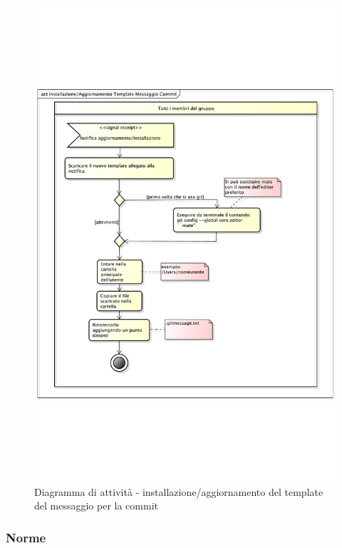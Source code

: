 			\begin{figure}[htbp]
				\centering
				\includegraphics[width=14cm]{images/inst_tpl_commit_msg.pdf}
				\caption{Diagramma di attività - installazione/aggiornamento del template del messaggio per la commit}
				\label{fig:installazione_msg_commit}
			\end{figure}

		\subsubsection{Norme}
